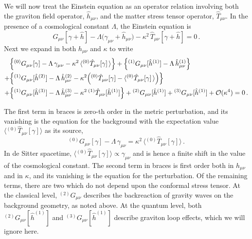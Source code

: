 \documentclass[preprint,prd,showpacs,superscriptaddress]{revtex4}
\begin{document}
We will now treat the Einstein equation as an operator relation involving both the graviton field operator,
$\hat{h}_{\mu\nu}$, and the matter stress tensor operator, $\hat{T}_{\mu\nu}$. In the presence of a
cosmological constant $\Lambda$, the Einstein equation is
\begin{equation}\label{E:Einstein}
	G_{\mu\nu}[\gamma+\hat{h}]-\Lambda\bigl(\gamma_{\mu\nu}+\hat{h}_{\mu\nu}\bigr)-
	\kappa^{2}\,\hat{T}_{\mu\nu}[\gamma+\hat{h}]=0\,.
\end{equation}
Next we expand in both $h_{\mu\nu}$ and $\kappa$ to write
 \begin{align}\label{E:expand}
	&\Bigl\{{}^{(0)}G_{\mu\nu}[\gamma]-\Lambda\,\gamma_{\mu\nu}-\kappa^{2}\,\langle{}^{(0)}\hat{T}_{\mu\nu}[\gamma]\,\rangle\Bigr\}
	+\Bigl\{{}^{(1)}G_{\mu\nu}[\hat{h}^{(1)}]-\Lambda\,\hat{h}^{(1)}_{\mu\nu}\Bigr\}\\
	+&\Bigl\{{}^{(1)}G_{\mu\nu}[\hat{h}^{(2)}]-\Lambda\,\hat{h}^{(2)}_{\mu\nu}-\kappa^{2}\Bigl({}^{(0)}\hat{T}_{\mu\nu}[\gamma]
	-\langle{}^{(0)}\hat{T}_{\mu\nu}[\gamma]\,\rangle\Bigr)\Bigr\}\notag\\
	+&\Bigl\{{}^{(1)}G_{\mu\nu}[\hat{h}^{(3)}]-\Lambda\,\hat{h}^{(3)}_{\mu\nu}-
	\kappa^{2}\,{}^{(1)}\hat{T}_{\mu\nu}[\hat{h}^{(1)}]\Bigr\}+
	{}^{(2)}G_{\mu\nu}[\hat{h}^{(1)}]+{}^{(3)}G_{\mu\nu}[\hat{h}^{(1)}]+\mathcal{O}(\kappa^{4})=0\,.\notag
\end{align}

The first term in braces is  zero-th order in the metric perturbation, and its vanishing is the equation
for the background with the expectation value $\langle{}^{(0)}\hat{T}_{\mu\nu}[\gamma]\rangle$ as its source,
\begin{equation}
{}^{(0)}G_{\mu\nu}[\gamma]-\Lambda\,\gamma_{\mu\nu} =
\kappa^{2}\,\langle{}^{(0)}\hat{T}_{\mu\nu}[\gamma]\rangle \,.
\label{E:h0-eq}
\end{equation}
In de Sitter spacetime, $\langle{}^{(0)}\hat{T}_{\mu\nu}[\gamma]\rangle \propto \gamma_{\mu\nu}$ 
and is hence a finite
shift in the value of the cosmological constant. The second term in braces is first order both in  $h_{\mu\nu}$ and 
in $\kappa$, and its vanishing is the equation for the perturbation. Of the remaining terms, there are two which
do not depend upon the conformal stress tensor. At the classical level, ${}^{(2)}G_{\mu\nu}$ describes the 
backreaction of gravity waves on the background geometry, as noted above. At the quantum level, both 
${}^{(2)}G_{\mu\nu}[\hat{h}^{(1)}]$ and ${}^{(3)}G_{\mu\nu}[\hat{h}^{(1)}]$ describe graviton loop effects,
which we will ignore here.
\end{document}
